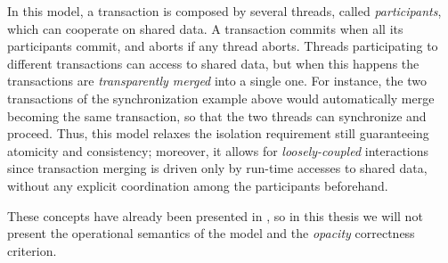 In this model, a transaction is composed by several threads, called \emph{participants}, which can cooperate on shared data.  A transaction commits when all its participants commit, and aborts if any thread aborts.  Threads participating to different transactions can access to shared data, but when this happens the transactions are \emph{transparently merged} into a single one.  For instance, the two transactions of the synchronization example above would automatically merge becoming the same transaction, so that the two threads can synchronize and proceed.  Thus, this model relaxes the isolation requirement still guaranteeing atomicity and consistency; moreover, it allows for \emph{loosely-coupled} interactions since transaction merging is driven only by run-time accesses to shared data, without any explicit coordination among the participants beforehand.

These concepts have already been presented in \cite{MiculanPT15,Toneguzzo,OpenTransactionsSpec}, so in this thesis we will not present the operational semantics of the model and the \emph{opacity} correctness criterion\cite{gk:ppopp08}.

